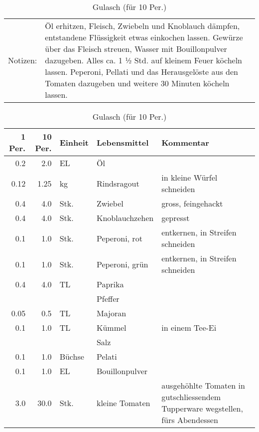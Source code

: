\documentclass[11pt,a4paper]{article}%
\begin{document}
\begin{table}[h]%
\caption{Gulasch (für 10 Per.)}%
\begin{tabularx}{\textwidth}{l X}%
Notizen:&Öl erhitzen, Fleisch, Zwiebeln und Knoblauch dämpfen, entstandene Flüssigkeit etwas einkochen lassen. Gewürze über das Fleisch streuen, Wasser mit Bouillonpulver dazugeben. Alles ca. 1 ½ Std. auf kleinem Feuer köcheln lassen. Peperoni, Pellati und das Herausgelöste aus den Tomaten dazugeben und weitere 30 Minuten köcheln lassen.\\%
\end{tabularx}%
\par%
\begin{tabularx}{\textwidth}{| r | r | l | l | X |}%
\hline%
\tiny{1 Per.}&\tiny{10 Per.}&\tiny{Einheit}&\tiny{Lebensmittel}&\tiny{Kommentar}\\%
\hline%
0.2&2.0&EL&Öl&\\%
\hline%
0.12&1.25&kg&Rindsragout&in kleine Würfel schneiden\\%
\hline%
0.4&4.0&Stk.&Zwiebel&gross, feingehackt\\%
\hline%
0.4&4.0&Stk.&Knoblauchzehen&gepresst\\%
\hline%
0.1&1.0&Stk.&Peperoni, rot&entkernen, in Streifen schneiden\\%
\hline%
0.1&1.0&Stk.&Peperoni, grün&entkernen, in Streifen schneiden\\%
\hline%
0.4&4.0&TL&Paprika&\\%
\hline%
&&&Pfeffer&\\%
\hline%
0.05&0.5&TL&Majoran&\\%
\hline%
0.1&1.0&TL&Kümmel&in einem Tee{-}Ei\\%
\hline%
&&&Salz&\\%
\hline%
0.1&1.0&Büchse&Pelati&\\%
\hline%
0.1&1.0&EL&Bouillonpulver&\\%
\hline%
3.0&30.0&Stk.&kleine Tomaten&ausgehöhlte Tomaten in gutschliessendem Tupperware wegstellen, fürs Abendessen\\%
\hline%
\end{tabularx}%
\end{table}

%
\vspace{0.75cm}%
\renewcommand{\arraystretch}{1.25}%
\end{document}
